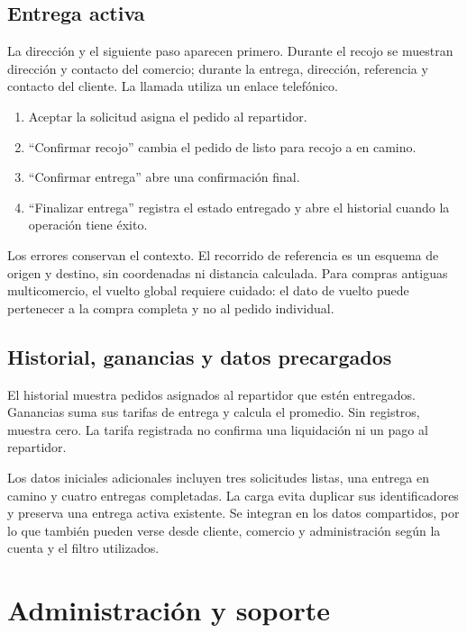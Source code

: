 \documentclass[12pt,letterpaper]{article}
\begin{document}
\subsection{Entrega activa}

La dirección y el siguiente paso aparecen primero. Durante el recojo se muestran dirección y contacto del comercio; durante la entrega, dirección, referencia y contacto del cliente. La llamada utiliza un enlace telefónico.

\begin{enumerate}
  \item Aceptar la solicitud asigna el pedido al repartidor.
  \item ``Confirmar recojo'' cambia el pedido de listo para recojo a en camino.
  \item ``Confirmar entrega'' abre una confirmación final.
  \item ``Finalizar entrega'' registra el estado entregado y abre el historial cuando la operación tiene éxito.
\end{enumerate}

Los errores conservan el contexto. El recorrido de referencia es un esquema de origen y destino, sin coordenadas ni distancia calculada. Para compras antiguas multicomercio, el vuelto global requiere cuidado: el dato de vuelto puede pertenecer a la compra completa y no al pedido individual.

\subsection{Historial, ganancias y datos precargados}

El historial muestra pedidos asignados al repartidor que estén entregados. Ganancias suma sus tarifas de entrega y calcula el promedio. Sin registros, muestra cero. La tarifa registrada no confirma una liquidación ni un pago al repartidor.

Los datos iniciales adicionales incluyen tres solicitudes listas, una entrega en camino y cuatro entregas completadas. La carga evita duplicar sus identificadores y preserva una entrega activa existente. Se integran en los datos compartidos, por lo que también pueden verse desde cliente, comercio y administración según la cuenta y el filtro utilizados.

\section{Administración y soporte}
\end{document}
